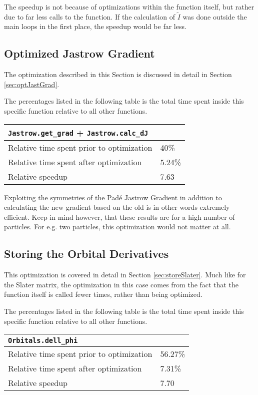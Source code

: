 The speedup is not because of optimizations within the function itself, but rather due to far less calls to the function. If the calculation of $\tilde I$ was done outside the main loops in the first place, the speedup would be far less. 


\subsection{Optimized Jastrow Gradient}

The optimization described in this Section is discussed in detail in Section \ref{sec:optJastGrad}.

The percentages listed in the following table is the total time spent inside this specific function relative to all other functions. 

\begin{tabular}{ll}
 \verb+Jastrow.get_grad+ + \verb+Jastrow.calc_dJ+ & \\
 \hline\hline
 Relative time spent prior to optimization & 40\% \\
 Relative time spent after optimization    & 5.24\% \\
 \hline
 Relative speedup                          & 7.63
\end{tabular}

Exploiting the symmetries of the Padé Jastrow Gradient in addition to calculating the new gradient based on the old is in other words extremely efficient. Keep in mind however, that these results are for a high number of particles. For e.g. two particles, this optimization would not matter at all.

\subsection{Storing the Orbital Derivatives}

This optimization is covered in detail in Section \ref{sec:storeSlater}. Much like for the Slater matrix, the optimization in this case comes from the fact that the function itself is called fewer times, rather than being optimized.

The percentages listed in the following table is the total time spent inside this specific function relative to all other functions. 


\begin{tabular}{ll}
 \verb+Orbitals.dell_phi+ & \\
 \hline\hline
 Relative time spent prior to optimization & 56.27\% \\
 Relative time spent after optimization    & 7.31\% \\
 \hline
 Relative speedup                          & 7.70
\end{tabular}



